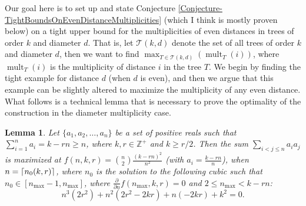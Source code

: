\documentclass[12]{article}
\newcommand{\Z}{\mathbb{Z}}
\DeclarePairedDelimiter\ceil{\lceil}{\rceil}
\DeclareMathOperator{\mult}{mult}
\newtheorem{lem}{Lemma} %
\theoremstyle{definition}
\begin{document}
	Our goal here is to set up and state Conjecture \ref{Conjecture-TightBoundsOnEvenDistanceMultiplicities} (which I think is mostly proven below) on a tight upper bound for the multiplicities of even distances in trees of order $k$ and diameter $d$.  That is, let $\mathcal{T}(k,d)$ denote the set of all trees of order $k$ and diameter $d$, then we want to find $\max_{T \in \mathcal{T}(k,d)}(\mult_T(i))$, where $\mult_T(i)$ is the multiplicity of distance $i$ in the tree $T$.  We begin by finding the tight example for distance $d$ (when $d$ is even), and then we argue that this example can be slightly altered to maximize the multiplicity of any even distance.  What follows is a technical lemma that is necessary to prove the optimality of the construction in the diameter multiplicity case.
	
	\begin{lem}\label{Lemma-MaximizingMultiplicityInTreeTechnicalLemma}
		Let $\{a_1, a_2, \ldots, a_n\}$ be a set of positive reals such that $\sum_{i = 1}^n a_i = k - rn \geq n$, where $k, r \in \Z^+$ and $k \geq r/2$.  Then the sum $\sum_{i<j\leq n}a_ia_j$ is maximized at $f(n,k,r) = {n \choose 2}\frac{(k-rn)^2}{n^2}$
		(with $a_i = \frac{k-rn}{n}$), when $n=\ceil{n_0(k,r)}$, where $n_0$ is the solution to the following cubic such that $n_0 \in [n_{\max}-1, n_{\max}]$, where $\frac{\partial}{\partial n}f(n_{\max},k,r) = 0$ and $2 \leq n_{\max} < k-rn$:
		$$n^3(2r^2) + n^2(2r^2-2kr) + n(-2kr) + k^2 = 0.$$
	\end{lem}
\end{document}
